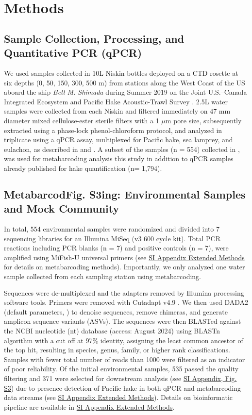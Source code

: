 \documentclass{article}
\begin{document}
\section*{Methods}

\subsection*{Sample Collection, Processing, and Quantitative PCR (qPCR)}
We used samples collected in 10L Niskin bottles deployed on a CTD rosette at six depths (0, 50, 150, 300, 500 m) from stations along the West Coast of the US aboard the ship \textit{Bell M. Shimada} during Summer 2019 on the Joint U.S.–Canada Integrated Ecosystem and Pacific Hake Acoustic-Trawl Survey \cite{deblois2020}. 2.5L water samples were collected from each Niskin and filtered immediately on 47 mm diameter mixed cellulose-ester sterile filters with a 1 $\mu$m pore size, subsequently extracted using a phase-lock phenol-chloroform protocol, and analyzed in triplicate using a qPCR assay, multiplexed for Pacific hake, sea lamprey, and eulachon, as described in \cite{ramon-laca2021} and \cite{shelton2022}. A subset of the samples (n = 554) collected in \cite{shelton2022}, was used for metabarcoding analysis this study in addition to qPCR samples already published for hake quantification \cite{shelton2022} (n= 1,794). 

\subsection*{MetabarcodFig. S3ing: Environmental Samples and Mock Community}
In total, 554 environmental samples were randomized and divided into 7 sequencing libraries for an Illumina MiSeq (v3 600 cycle kit). Total PCR reactions including PCR blanks (n = 7) and positive controls (n = 7), were amplified using MiFish-U universal primers \cite{miya2015} (see \href{SI_Appendix.pdf}{SI Appendix Extended Methods} for details on metabarcoding methods). Importantly, we only analyzed one water sample collected from each sampling station using metabarcoding.

Sequences were de-multiplexed and the adapters removed by Illumina processing software tools. Primers were removed with Cutadapt v4.9 \cite{martin2011}. We then used DADA2 (default parameters, \cite{callahan2016}) to denoise sequences, remove chimeras, and generate amplicon sequence variants (ASVs). The sequences were then BLASTed against the NCBI nucleotide (nt) database (access: August 2024) using BLASTn algorithm with a cut off at 97\% identity, assigning the least common ancestor of the top hit, resulting in species, genus, family, or higher rank classifications. Samples with fewer total number of reads than 1000 were filtered as an indicator of poor reliability. Of the initial environmental samples, 535 passed the quality filtering and 371 were selected for downstream analysis (see \href{SI_Appendix.pdf}{SI Appendix, Fig. S3}) due to presence detection of Pacific hake in both qPCR and metabarcoding data streams (see \href{SI_Appendix.pdf}{SI Appendix Extended Methods}). Details on bioinformatic pipeline are available in \href{SI_Appendix.pdf}{SI Appendix Extended Methods}.
\end{document}
